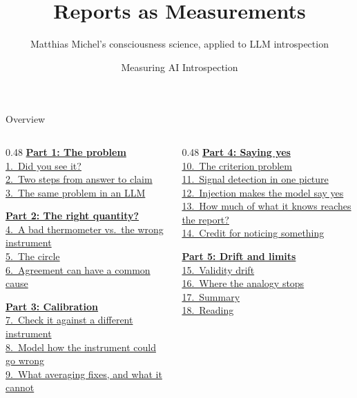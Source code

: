 \documentclass[aspectratio=169,11pt]{beamer}
\title{Reports as Measurements}
\subtitle{Matthias Michel's consciousness science, applied to LLM introspection}
\author{Measuring AI Introspection}
\date{}
\institute{}
\begin{document}
\maketitle

\begin{frame}{Overview}\footnotesize
\begin{columns}[T]
\begin{column}{0.48\textwidth}
\hyperlink{part1}{\textbf{Part 1: The problem}}\\[0.15em]
{\scriptsize%
\quad\hyperlink{flash}{1.~Did you see it?}\\%
\quad\hyperlink{twosteps}{2.~Two steps from answer to claim}\\%
\quad\hyperlink{llm}{3.~The same problem in an LLM}%
}\vspace{0.3em}

\hyperlink{part2}{\textbf{Part 2: The right quantity?}}\\[0.15em]
{\scriptsize%
\quad\hyperlink{thermo}{4.~A bad thermometer vs.\ the wrong instrument}\\%
\quad\hyperlink{circle}{5.~The circle}\\%
\quad\hyperlink{commoncause}{6.~Agreement can have a common cause}%
}\vspace{0.3em}

\hyperlink{part3}{\textbf{Part 3: Calibration}}\\[0.15em]
{\scriptsize%
\quad\hyperlink{concordance}{7.~Check it against a different instrument}\\%
\quad\hyperlink{modelcal}{8.~Model how the instrument could go wrong}\\%
\quad\hyperlink{averaging}{9.~What averaging fixes, and what it cannot}%
}
\end{column}
\begin{column}{0.48\textwidth}
\hyperlink{part4}{\textbf{Part 4: Saying yes}}\\[0.15em]
{\scriptsize%
\quad\hyperlink{scale}{10.~The criterion problem}\\%
\quad\hyperlink{sdt}{11.~Signal detection in one picture}\\%
\quad\hyperlink{yesbias}{12.~Injection makes the model say yes}\\%
\quad\hyperlink{metad}{13.~How much of what it knows reaches the report?}\\%
\quad\hyperlink{content}{14.~Credit for noticing something}%
}\vspace{0.3em}

\hyperlink{part5}{\textbf{Part 5: Drift and limits}}\\[0.15em]
{\scriptsize%
\quad\hyperlink{drift}{15.~Validity drift}\\%
\quad\hyperlink{limits}{16.~Where the analogy stops}\\%
\quad\hyperlink{summary}{17.~Summary}\\%
\quad\hyperlink{reading}{18.~Reading}%
}
\end{column}
\end{columns}
\end{frame}
\end{document}
